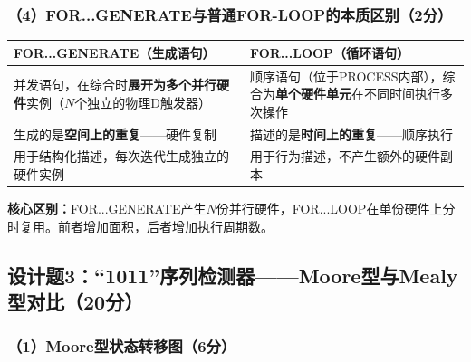 \subsubsection{（4）FOR...GENERATE与普通FOR-LOOP的本质区别（2分）}

\begin{center}
\begin{tabular}{|p{4.5cm}|p{6.5cm}|}
\hline
\textbf{FOR...GENERATE（生成语句）} & \textbf{FOR...LOOP（循环语句）} \\
\hline
并发语句，在综合时\textbf{展开为多个并行硬件}实例（$N$个独立的物理D触发器） & 顺序语句（位于PROCESS内部），综合为\textbf{单个硬件单元}在不同时间执行多次操作 \\
\hline
生成的是\textbf{空间上的重复}——硬件复制 & 描述的是\textbf{时间上的重复}——顺序执行 \\
\hline
用于结构化描述，每次迭代生成独立的硬件实例 & 用于行为描述，不产生额外的硬件副本 \\
\hline
\end{tabular}
\end{center}

\textbf{核心区别：}FOR...GENERATE产生$N$份并行硬件，FOR...LOOP在单份硬件上分时复用。前者增加面积，后者增加执行周期数。

\subsection{设计题3：“1011”序列检测器——Moore型与Mealy型对比（20分）}

\subsubsection{（1）Moore型状态转移图（6分）}

